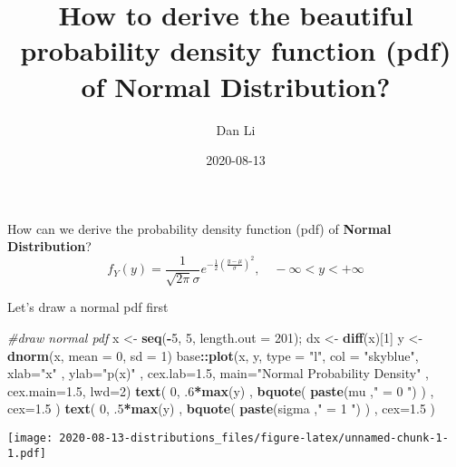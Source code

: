 \documentclass[
]{article}
\title{How to derive the beautiful probability density function (pdf) of
Normal Distribution?}
\author{Dan Li}
\date{2020-08-13}
\newenvironment{Shaded}{\begin{snugshade}}{\end{snugshade}}
\newcommand{\CommentTok}[1]{\textcolor[rgb]{0.56,0.35,0.01}{\textit{#1}}}
\newcommand{\DataTypeTok}[1]{\textcolor[rgb]{0.13,0.29,0.53}{#1}}
\newcommand{\DecValTok}[1]{\textcolor[rgb]{0.00,0.00,0.81}{#1}}
\newcommand{\FloatTok}[1]{\textcolor[rgb]{0.00,0.00,0.81}{#1}}
\newcommand{\KeywordTok}[1]{\textcolor[rgb]{0.13,0.29,0.53}{\textbf{#1}}}
\newcommand{\NormalTok}[1]{#1}
\newcommand{\OperatorTok}[1]{\textcolor[rgb]{0.81,0.36,0.00}{\textbf{#1}}}
\newcommand{\StringTok}[1]{\textcolor[rgb]{0.31,0.60,0.02}{#1}}
\begin{document}
\maketitle

How can we derive the probability density function (pdf) of
\textbf{Normal Distribution}?
\[f_Y(y)=\frac{1}{\sqrt{2\pi}\sigma}e^{-\frac{1}{2}(\frac{y-\mu}{\sigma})^2}, \quad -\infty<y<+\infty\]

Let's draw a normal pdf first

\begin{Shaded}
\begin{Highlighting}[]
\CommentTok{\#draw normal pdf}
\NormalTok{x \textless{}{-}}\StringTok{ }\KeywordTok{seq}\NormalTok{(}\OperatorTok{{-}}\DecValTok{5}\NormalTok{, }\DecValTok{5}\NormalTok{, }\DataTypeTok{length.out =} \DecValTok{201}\NormalTok{); dx \textless{}{-}}\StringTok{ }\KeywordTok{diff}\NormalTok{(x)[}\DecValTok{1}\NormalTok{]}
\NormalTok{y \textless{}{-}}\StringTok{ }\KeywordTok{dnorm}\NormalTok{(x, }\DataTypeTok{mean =} \DecValTok{0}\NormalTok{, }\DataTypeTok{sd =} \DecValTok{1}\NormalTok{)}
\NormalTok{base}\OperatorTok{::}\KeywordTok{plot}\NormalTok{(x, y, }\DataTypeTok{type =} \StringTok{"l"}\NormalTok{, }\DataTypeTok{col =} \StringTok{"skyblue"}\NormalTok{,}
           \DataTypeTok{xlab=}\StringTok{"x"}\NormalTok{ , }\DataTypeTok{ylab=}\StringTok{"p(x)"}\NormalTok{ , }\DataTypeTok{cex.lab=}\FloatTok{1.5}\NormalTok{,}
    \DataTypeTok{main=}\StringTok{"Normal Probability Density"}\NormalTok{ , }\DataTypeTok{cex.main=}\FloatTok{1.5}\NormalTok{,}
    \DataTypeTok{lwd=}\DecValTok{2}\NormalTok{)}
\KeywordTok{text}\NormalTok{( }\DecValTok{0}\NormalTok{, }\FloatTok{.6}\OperatorTok{*}\KeywordTok{max}\NormalTok{(y) , }\KeywordTok{bquote}\NormalTok{( }\KeywordTok{paste}\NormalTok{(mu ,}\StringTok{" = 0 "}\NormalTok{) )}
\NormalTok{      , }\DataTypeTok{cex=}\FloatTok{1.5}\NormalTok{ )}
\KeywordTok{text}\NormalTok{( }\DecValTok{0}\NormalTok{, }\FloatTok{.5}\OperatorTok{*}\KeywordTok{max}\NormalTok{(y) , }\KeywordTok{bquote}\NormalTok{( }\KeywordTok{paste}\NormalTok{(sigma ,}\StringTok{" = 1 "}\NormalTok{) )}
\NormalTok{      , }\DataTypeTok{cex=}\FloatTok{1.5}\NormalTok{ )}
\end{Highlighting}
\end{Shaded}

\texttt{[image: 2020-08-13-distributions\_files/figure-latex/unnamed-chunk-1-1.pdf]}
\end{document}
